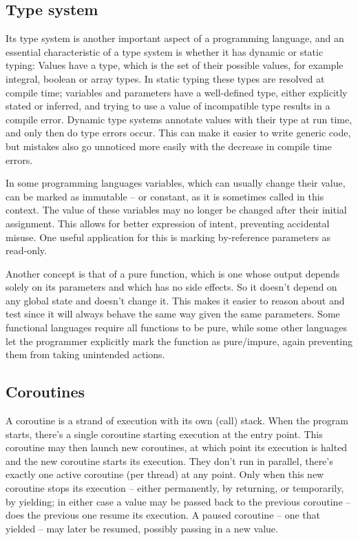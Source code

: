 		\subsection{Type system}
		Its type system is another important aspect of a programming language, and an essential characteristic of a type system is whether it has dynamic or static typing: Values have a type, which is the set of their possible values, for example integral, boolean or array types. In static typing these types are resolved at compile time; variables and parameters have a well-defined type, either explicitly stated or inferred, and trying to use a value of incompatible type results in a compile error.
		Dynamic type systems annotate values with their type at run time, and only then do type errors occur. This can make it easier to write generic code, but mistakes also go unnoticed more easily with the decrease in compile time errors.
		
		In some programming languages variables, which can usually change their value, can be marked as immutable -- or constant, as it is sometimes called in this context. The value of these variables may no longer be changed after their initial assignment. This allows for better expression of intent, preventing accidental misuse. One useful application for this is marking by-reference parameters as read-only.
		
		Another concept is that of a pure function, which is one whose output depends solely on its parameters and which has no side effects. So it doesn't depend on any global state and doesn't change it. This makes it easier to reason about and test since it will always behave the same way given the same parameters. Some functional languages require all functions to be pure, while some other languages let the programmer explicitly mark the function as pure/impure, again preventing them from taking unintended actions.
		
		\subsection{Coroutines}
		
		A coroutine is a strand of execution with its own (call) stack. When the program starts, there's a single coroutine starting execution at the entry point. This coroutine may then launch new coroutines, at which point its execution is halted and the new coroutine starts its execution. They don't run in parallel, there's exactly one active coroutine (per thread) at any point. Only when this new coroutine stops its execution -- either permanently, by returning, or temporarily, by yielding; in either case a value may be passed back to the previous coroutine -- does the previous one resume its execution. A paused coroutine -- one that yielded -- may later be resumed, possibly passing in a new value.
		
